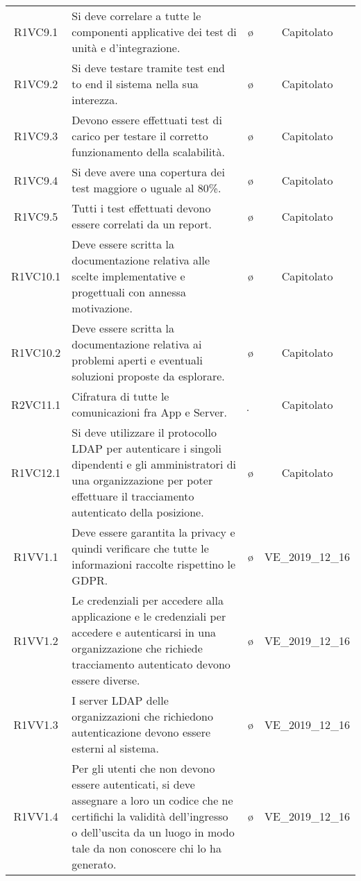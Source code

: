 {\begin{longtable}{ c C{8cm} c c}
R1VC9.1 & Si deve correlare a tutte le componenti applicative dei test di unità e d’integrazione. & \o & Capitolato \\
R1VC9.2 & Si deve testare tramite test end to end il sistema nella sua interezza. & \o & Capitolato \\
R1VC9.3 & Devono essere effettuati test di carico per testare il corretto funzionamento della scalabilità. & \o & Capitolato \\
R1VC9.4 & Si deve avere una copertura dei test maggiore o uguale al 80\%. & \o & Capitolato \\
R1VC9.5 & Tutti i test effettuati devono essere correlati da un report. & \o & Capitolato \\
R1VC10.1 & Deve essere scritta la documentazione relativa alle scelte implementative e progettuali con annessa motivazione. & \o & Capitolato \\
R1VC10.2 & Deve essere scritta la documentazione relativa ai problemi aperti e eventuali soluzioni proposte da esplorare. & \o & Capitolato \\
R2VC11.1 & Cifratura di tutte le comunicazioni fra App e Server. & \d & Capitolato  \\
R1VC12.1 & Si deve utilizzare il protocollo LDAP per autenticare i singoli dipendenti e gli amministratori di una organizzazione per poter effettuare il tracciamento autenticato della posizione. & \o & Capitolato \\	
R1VV1.1 & Deve essere garantita la privacy e quindi verificare che tutte le informazioni raccolte rispettino le GDPR. & \o & VE\_2019\_12\_16 \\
R1VV1.2 & Le credenziali per accedere alla applicazione e le credenziali per accedere e autenticarsi in una organizzazione che richiede tracciamento autenticato devono essere diverse. & \o & VE\_2019\_12\_16 \\
R1VV1.3 & I server LDAP delle organizzazioni che richiedono autenticazione devono essere esterni al sistema.  & \o & VE\_2019\_12\_16 \\
R1VV1.4 & Per gli utenti che non devono essere autenticati, si deve assegnare a loro un codice che ne certifichi la validità dell’ingresso o dell'uscita da un luogo in modo tale da non conoscere chi lo ha generato. & \o & VE\_2019\_12\_16 \\
\end{longtable}
}